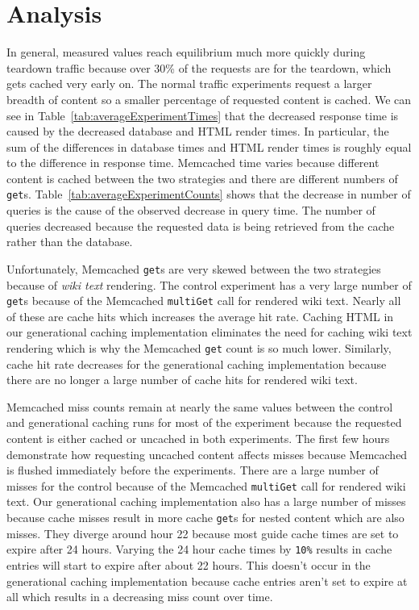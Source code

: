 \documentclass[12pt]{ucthesis}
\begin{document}
\section{Analysis} \label{resultsAnalysis}
In general, measured values reach equilibrium much more quickly during teardown traffic because over 30\% of the requests are for the teardown, which gets cached very early on.
The normal traffic experiments request a larger breadth of content so a smaller percentage of requested content is cached.
We can see in Table~\ref{tab:averageExperimentTimes} that the decreased response time is caused by the decreased database and HTML render times.
In particular, the sum of the differences in database times and HTML render times is roughly equal to the difference in response time.
\textsf{Memcached} time varies because different content is cached between the two strategies and there are different numbers of {\tt get}s.
Table~\ref{tab:averageExperimentCounts} shows that the decrease in number of queries is the cause of the observed decrease in query time.
The number of queries decreased because the requested data is being retrieved from the cache rather than the database.

Unfortunately, \textsf{Memcached} {\tt get}s are very skewed between the two strategies because of \textit{wiki text} rendering.
The control experiment has a very large number of {\tt get}s because of the \textsf{Memcached} {\tt multiGet} call for rendered wiki text.
Nearly all of these are cache hits which increases the average hit rate.
Caching HTML in our generational caching implementation eliminates the need for caching wiki text rendering which is why the \textsf{Memcached} {\tt get} count is so much lower.
Similarly, cache hit rate decreases for the generational caching implementation because there are no longer a large number of cache hits for rendered wiki text.

\textsf{Memcached} miss counts remain at nearly the same values between the control and generational caching runs for most of the experiment because the requested content is either cached or uncached in both experiments.
The first few hours demonstrate how requesting uncached content affects misses because \textsf{Memcached} is flushed immediately before the experiments.
There are a large number of misses for the control because of the \textsf{Memcached} {\tt multiGet} call for rendered wiki text.
Our generational caching implementation also has a large number of misses because cache misses result in more cache {\tt get}s for nested content which are also misses.
They diverge around hour 22 because most guide cache times are set to expire after 24 hours.
Varying the 24 hour cache times by {\tt 10\%} results in cache entries will start to expire after about 22 hours.
This doesn't occur in the generational caching implementation because cache entries aren't set to expire at all which results in a decreasing miss count over time.
\end{document}
